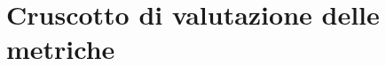 \section{Cruscotto di valutazione delle metriche}

\clearpage
\clearpage
\clearpage
\clearpage
\clearpage